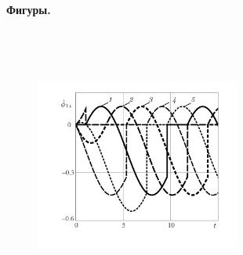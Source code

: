 % 

% 

% 

% 


\newpage

{\bf Фигуры.}

\begin{figure}[H]
    \hspace{-0.6cm}
        \caption{\ }
        \label{fig:wheel}
    \endminipage
        \caption{\ }
        \label{fig:vehicle}
    \endminipage
\end{figure}

\begin{figure}[H]
    \centering
    \quad
    \caption{\ }
    \label{fig:overlap_and_change}
\end{figure}



\begin{figure}[H]
  \hspace{2.73cm}\includegraphics[width=0.6\textwidth]{pic/figure5_1.pdf}
  \caption{\ }
  \label{fig:selfrot}
\end{figure}

